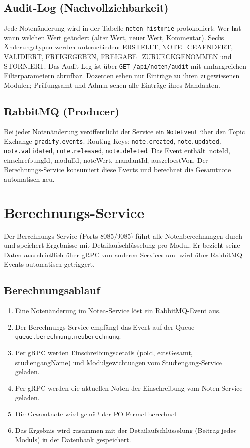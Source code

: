\documentclass[12pt,a4paper,ngerman]{article}
\begin{document}
\subsection{Audit-Log (Nachvollziehbarkeit)}

Jede Notenänderung wird in der Tabelle \texttt{noten\_historie} protokolliert: Wer hat wann welchen Wert geändert (alter Wert, neuer Wert, Kommentar). Sechs Änderungstypen werden unterschieden: ERSTELLT, NOTE\_GEAENDERT, VALIDIERT, FREIGEGEBEN, FREIGABE\_ZURUECKGENOMMEN und STORNIERT. Das Audit-Log ist über \texttt{GET /api/noten/audit} mit umfangreichen Filterparametern abrufbar. Dozenten sehen nur Einträge zu ihren zugewiesenen Modulen; Prüfungsamt und Admin sehen alle Einträge ihres Mandanten.

\subsection{RabbitMQ (Producer)}

Bei jeder Notenänderung veröffentlicht der Service ein \texttt{NoteEvent} über den Topic Exchange \texttt{gradify.events}. Routing-Keys: \texttt{note.created}, \texttt{note.updated}, \texttt{note.validated}, \texttt{note.released}, \texttt{note.deleted}. Das Event enthält: noteId, einschreibungId, modulId, noteWert, mandantId, ausgeloestVon. Der Berechnungs-Service konsumiert diese Events und berechnet die Gesamtnote automatisch neu.

\section{Berechnungs-Service}

Der Berechnungs-Service (Ports 8085/9085) führt alle Notenberechnungen durch und speichert Ergebnisse mit Detailaufschlüsselung pro Modul. Er bezieht seine Daten ausschließlich über gRPC von anderen Services und wird über RabbitMQ-Events automatisch getriggert.

\subsection{Berechnungsablauf}

\begin{enumerate}
\item Eine Notenänderung im Noten-Service löst ein RabbitMQ-Event aus.
\item Der Berechnungs-Service empfängt das Event auf der Queue \texttt{queue.berechnung.neuberechnung}.
\item Per gRPC werden Einschreibungsdetails (poId, ectsGesamt, studiengangName) und Modulgewichtungen vom Studiengang-Service geladen.
\item Per gRPC werden die aktuellen Noten der Einschreibung vom Noten-Service geladen.
\item Die Gesamtnote wird gemäß der PO-Formel berechnet.
\item Das Ergebnis wird zusammen mit der Detailaufschlüsselung (Beitrag jedes Moduls) in der Datenbank gespeichert.
\end{enumerate}
\end{document}
